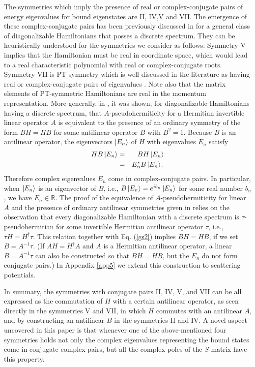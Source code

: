 The symmetries which imply the presence of real or complex-conjugate pairs of energy eigenvalues for bound eigenstates
are II, IV,V and VII.
The emergence of these complex-conjugate pairs has been previously discussed in \cite{Mostafazadeh2002,Bender2010} for a general class of diagonalizable Hamiltonians that posses a discrete spectrum. They can be heuristically understood for the symmetries we consider as follows: Symmetry V implies that the Hamiltonian must be real in coordinate space, which would lead to a real characteristic polynomial with real or complex-conjugate roots. Symmetry VII is PT symmetry which is well discussed in the literature as having real or complex-conjugate pairs of eigenvalues \cite{Bender1998}. Note also that the matrix elements of PT-symmetric Hamiltonians are real in the momentum representation. More generally, in \cite{Mostafazadeh2002b}, it was shown, for diagonalizable Hamiltonians having a discrete spectrum, that $A$-pseudohermiticity for a Hermitian invertible linear operator $A$ is equivalent to the presence of an ordinary symmetry of the form $BH = HB$ for some antilinear operator $B$ with $B^2 = 1$. Because $B$ is an antilinear operator, the eigenvectors $\ket{E_n}$  of $H$ with eigenvalues $E_n$ satisfy
%
\begin{eqnarray}
H B \ket{E_n}&=&B H \ket{E_n} \nonumber \\
				   &=&E_{n}^{*} B \ket{E_n}.
\end{eqnarray}
%
Therefore complex eigenvalues $E_n$ come in complex-conjugate pairs. In particular, when $\ket{E_n}$  is an eigenvector of $B$, i.e., $B\ket{E_n} = e^{ib_n} \ket{E_n}$ for some real number $b_n$, we have $E_n \in \mathbb{R}$.
The proof of the equivalence of $A$-pseudohermiticity for linear $A$ and the presence of ordinary antilinear symmetries given in \cite{Mostafazadeh2002b} relies on the observation that every diagonalizable Hamiltonian with a discrete spectrum is $\tau$-pseudohermitian for some invertible Hermitian antilinear operator $\tau$, i.e.,
$\tau H = H^\dagger\tau$. This relation together with Eq. (\ref{gs2}) implies $BH = HB$,
if we set $B = A^{-1}\tau$. (If $AH=H^\dagger A$ and $A$ is a Hermitian antilinear operator, a linear $B = A^{-1}\tau$ can also be constructed so that $BH=HB$, but the $E_n$ do not form conjugate pairs.)
In Appendix \ref{app5} we extend this construction to scattering potentials.

In summary, the symmetries with conjugate pairs II, IV, V, and VII can be all expressed as the commutation of $H$ with a certain antilinear operator, as seen directly in the symmetries V and VII, in which $H$ commutes with an antilinear $A$,  and by constructing an antilinear $B$ in the symmetries II and IV.
A novel aspect uncovered in this paper is that whenever one of  the above-mentioned four symmetries holds not only the complex eigenvalues representing the bound states come in conjugate-complex pairs, but all the complex poles of the $S$-matrix have this property.


